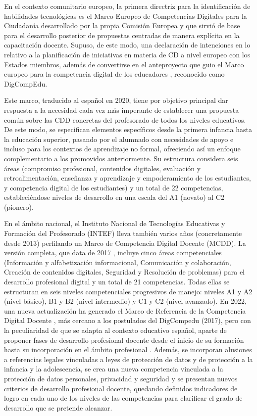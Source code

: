 \documentclass[spanish]{textolivre}
\begin{document}
En el contexto comunitario europeo, la primera directriz para la identificación de habilidades tecnológicas es el Marco Europeo de Competencias Digitales para la Ciudadanía desarrollado por la propia Comisión Europea \cite{ferrari_digcomp:_2013} y que sirvió de base para el desarrollo posterior de propuestas centradas de manera explícita en la capacitación docente. Supuso, de este modo, una declaración de intenciones en lo relativo a la planificación de iniciativas en materia de CD a nivel europeo con los Estados miembros, además de convertirse en el anteproyecto que guio el Marco europeo para la competencia digital de los educadores \cite{redecker_european_2017}, reconocido como DigCompEdu.

Este marco, traducido al español en 2020, tiene por objetivo principal dar respuesta a la necesidad cada vez más imperante de establecer una propuesta común sobre las CDD concretas del profesorado de todos los niveles educativos. De este modo, se especifican elementos específicos desde la primera infancia hasta la educación superior, pasando por el alumnado con necesidades de apoyo e incluso para los contextos de aprendizaje no formal, ofreciendo así un enfoque complementario a los promovidos anteriormente. Su estructura considera seis áreas (compromiso profesional, contenidos digitales, evaluación y retroalimentación, enseñanza y aprendizaje y empoderamiento de los estudiantes, y competencia digital de los estudiantes) y un total de 22 competencias, estableciéndose niveles de desarrollo en una escala del A1 (novato) al C2 (pionero).

En el ámbito nacional, el Instituto Nacional de Tecnologías Educativas y Formación del Profesorado (INTEF) lleva también varios años (concretamente desde 2013) \cite{intef2013marco} perfilando un Marco de Competencia Digital Docente (MCDD). La versión completa, que data de 2017 \cite{intef2017}, incluye cinco áreas competenciales (Información y alfabetización informacional, Comunicación y colaboración, Creación de contenidos digitales, Seguridad y Resolución de problemas) para el desarrollo profesional digital y un total de 21 competencias. Todas ellas se estructuran en seis niveles competenciales progresivos de manejo: niveles A1 y A2 (nivel básico), B1 y B2 (nivel intermedio) y C1 y C2 (nivel avanzado). En 2022, una nueva actualización ha generado el Marco de Referencia de la Competencia Digital Docente \cite{intef2022marco}, más cercano a los postulados del DigCompedu (2017), pero con la peculiaridad de que se adapta al contexto educativo español, aparte de proponer fases de desarrollo profesional docente desde el inicio de su formación hasta su incorporación en el ámbito profesional \cite{mas2022competencia}. Además, se incorporan alusiones a referencias legales vinculadas a leyes de protección de datos y de protección a la infancia y la adolescencia, se crea una nueva competencia vinculada a la protección de datos personales, privacidad y seguridad y se presentan nuevos criterios de desarrollo profesional docente, quedando definidos indicadores de logro en cada uno de los niveles de las competencias para clarificar el grado de desarrollo que se pretende alcanzar.
\end{document}
